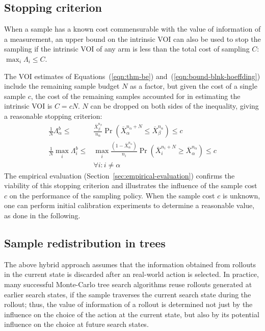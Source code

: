 \documentclass[]{article}
\newcommand{\secref}[1]{Section~\ref{#1}}
\newcommand{\eqrefs}[2]{Equations~(\ref{#1}) and~(\ref{#2})}
\begin{document}
\subsection{Stopping criterion}
\label{sec:control-stopping-criterion}

When a sample has a known cost commensurable with the value of
information of a measurement, an upper bound on the intrinsic VOI can also
be used to stop the sampling if the intrinsic VOI of any arm
is less than the total cost of sampling $C$: $\max_i \Lambda_i \le C$.

The VOI estimates of \eqrefs{eqn:thm-be}{eqn:bound-blnk-hoeffding} 
include the remaining sample budget $N$ as a
factor, but given the cost of a single sample $c$, the cost of the
remaining samples accounted for in estimating the intrinsic VOI is
$C=cN$. $N$ can be dropped on both sides of the inequality,
giving a reasonable stopping criterion:
\begin{align}
\frac 1 N \Lambda_\alpha^b \le&\frac {\overline X_\beta^{n_\beta}}
  {n_\alpha}\Pr(\overline X_\alpha^{n_\alpha+N}\le\overline
  X_\beta^{n_\alpha})\le c\nonumber\\
\frac 1 N \max_i\Lambda_i^b\le &\max_i\frac {(1-\overline X_\alpha^{n_\alpha})} {n_i}\Pr(\overline
  X_i^{n_i+N}\ge\overline X_\alpha^{n_\alpha})\le c\nonumber\\
    &\forall i: i\ne\alpha
\label{eqn:stopping-blnk}
\end{align}
The empirical evaluation (\secref{sec:empirical-evaluation})
confirms the viability of this stopping criterion and illustrates the
influence of the sample cost $c$ on the performance of
the sampling policy. When the sample cost $c$ is unknown, one can perform initial calibration experiments
to determine a reasonable value, as done in the following.

\subsection{Sample redistribution in trees}
\label{sec:control-redistribution}

The above hybrid approach assumes
that the information obtained from rollouts in the
current state is discarded after an real-world action is selected. In practice,
many successful Monte-Carlo tree search algorithms reuse rollouts
generated at earlier search states, if the sample traverses the
current search state during the rollout; thus, the value of information of a rollout is
determined not just by the influence on the choice of the action at
the current state, but also by its potential influence on the choice at future
search states.
\end{document}

